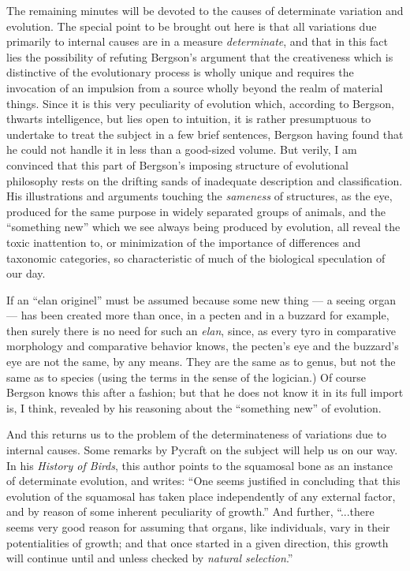 \documentclass[a4paper, 11pt, oneside, polutonikogreek, english]{article}
\begin{document}
The remaining minutes will be devoted to the causes of determinate variation and evolution. The special point to be brought out here is that all variations due primarily to internal causes are in a measure \emph{determinate}, and that in this fact lies the possibility of refuting Bergson's argument that the creativeness which is distinctive of the evolutionary process is wholly unique and requires the invocation of an impulsion from a source wholly beyond the realm of material things. Since it is this very peculiarity of evolution which, according to Bergson, thwarts intelligence, but lies open to intuition, it is rather presumptuous to undertake to treat the subject in a few brief sentences, Bergson having found that he could not handle it in less than a good-sized volume. But verily, I am convinced that this part of Bergson's imposing structure of evolutional philosophy rests on the drifting sands of inadequate description and classification. His illustrations and arguments touching the \emph{sameness} of structures, as the eye, produced for the same purpose in widely separated groups of animals, and the ``something new'' which we see always being produced by evolution, all reveal the toxic inattention to, or minimization of the importance of differences and taxonomic categories, so characteristic of much of the biological speculation of our day.

If an ``elan originel'' must be assumed because some new thing --- a seeing organ --- has been created more than once, in a pecten and in a buzzard for example, then surely there is no need for such an \emph{elan}, since, as every tyro in comparative morphology and comparative behavior knows, the pecten's eye and the buzzard's eye are not the same, by any means. They are the same as to genus, but not the same as to species (using the terms in the sense of the logician.) Of course Bergson knows this after a fashion; but that he does not know it in its full import is, I think, revealed by his reasoning about the ``something new'' of evolution.

And this returns us to the problem of the determinateness of variations due to internal causes. Some remarks by Pycraft on the subject will help us on our way. In his \emph{History of Birds}, this author points to the squamosal bone as an instance of determinate evolution, and writes: ``One seems justified in concluding that this evolution of the squamosal has taken place independently of any external factor, and by reason of some inherent peculiarity of growth.'' And further, ``...there seems very good reason for assuming that organs, like individuals, vary in their potentialities of growth; and that once started in a given direction, this growth will continue until and unless checked by \emph{natural selection}.''
\end{document}
